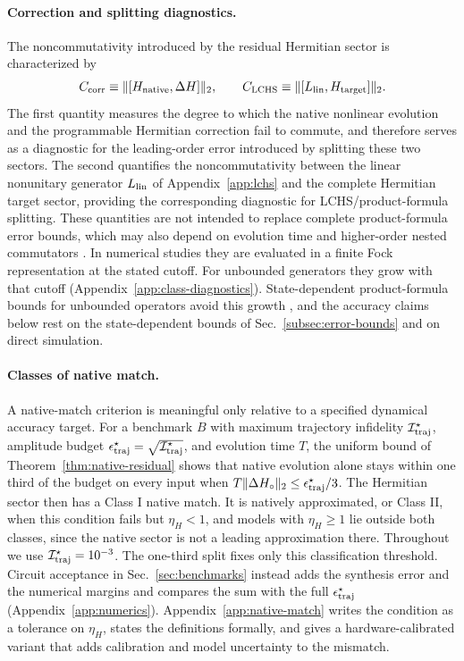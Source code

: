 \documentclass[pra,twocolumn,superscriptaddress,nofootinbib,floatfix]{revtex4-2}
\theoremstyle{remark}
\begin{document}
\paragraph{Correction and splitting diagnostics.}
The noncommutativity introduced by the residual Hermitian sector is characterized by
\begin{align}
C_{\rm corr}\equiv\|[H_{\rm native},\Delta H]\|_2, \qquad C_{\rm LCHS}\equiv\|[L_{\rm lin},H_{\rm target}]\|_2 .
\label{eq:combined-cost-diagnostics}
\end{align}
The first quantity measures the degree to which the native nonlinear evolution and the programmable Hermitian correction fail to commute, and therefore serves as a diagnostic for the leading-order error introduced by splitting these two sectors. The second quantifies the noncommutativity between the linear nonunitary generator \(L_{\rm lin}\) of Appendix~\ref{app:lchs} and the complete Hermitian target sector, providing the corresponding diagnostic for LCHS/product-formula splitting. These quantities are not intended to replace complete product-formula error bounds, which may also depend on evolution time and higher-order nested commutators \cite{Childs2021Trotter}. In numerical studies they are evaluated in a finite Fock representation at the stated cutoff. For unbounded generators they grow with that cutoff (Appendix~\ref{app:class-diagnostics}). State-dependent product-formula bounds for unbounded operators avoid this growth \cite{AnFangLin2021,Sahinoglu2021,Burgarth2024Strong}, and the accuracy claims below rest on the state-dependent bounds of Sec.~\ref{subsec:error-bounds} and on direct simulation.

\paragraph{Classes of native match.}
A native-match criterion is meaningful only relative to a specified dynamical accuracy target. For a benchmark \(B\) with maximum trajectory infidelity \(\mathcal I_{\rm traj}^{\star}\), amplitude budget \(\epsilon_{\rm traj}^{\star}=\sqrt{\mathcal I_{\rm traj}^{\star}}\), and evolution time \(T\), the uniform bound of Theorem~\ref{thm:native-residual} shows that native evolution alone stays within one third of the budget on every input when \(T\|\Delta H_\circ\|_2\le\epsilon_{\rm traj}^\star/3\). The Hermitian sector then has a Class I native match. It is natively approximated, or Class II, when this condition fails but \(\eta_H<1\), and models with \(\eta_H\geq1\) lie outside both classes, since the native sector is not a leading approximation there. Throughout we use \(\mathcal I_{\rm traj}^\star=10^{-3}\). The one-third split fixes only this classification threshold. Circuit acceptance in Sec.~\ref{sec:benchmarks} instead adds the synthesis error and the numerical margins and compares the sum with the full \(\epsilon_{\rm traj}^\star\) (Appendix~\ref{app:numerics}). Appendix~\ref{app:native-match} writes the condition as a tolerance on \(\eta_H\), states the definitions formally, and gives a hardware-calibrated variant that adds calibration and model uncertainty to the mismatch.
\end{document}
